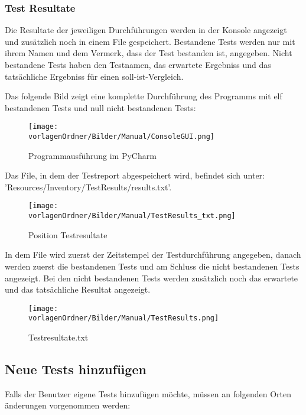 \documentclass[]{subfiles}
\begin{document}
	\subsubsection{Test Resultate}
		Die Resultate der jeweiligen Durchführungen werden in der Konsole angezeigt 
		und zusätzlich noch in einem File gespeichert.
		Bestandene Tests werden nur mit ihrem Namen und dem Vermerk, dass der Test bestanden ist,
		angegeben. 
		Nicht bestandene Tests haben den Testnamen, das erwartete Ergebniss und das tatsächliche
		Ergebniss für einen soll-ist-Vergleich.

		Das folgende Bild zeigt eine komplette Durchführung des Programms mit elf bestandenen
		Tests und null nicht bestandenen Tests: 


		\begin{figure}[h!]
			\begin{center}
				\texttt{[image: \\vorlagenOrdner/Bilder/Manual/ConsoleGUI.png]}
				\caption{Programmausführung im PyCharm}
			\end{center}
		\end{figure}

		\newpage

		Das File, in dem der Testreport abgespeichert wird, befindet sich unter: 
		'Resources/Inventory/TestResults/results.txt'.

		\begin{figure}[h!]
			\begin{center}
				\texttt{[image: \\vorlagenOrdner/Bilder/Manual/TestResults\_txt.png]}
				\caption{Position Testresultate}
			\end{center}
		\end{figure}

		In dem File wird zuerst der Zeitstempel der Testdurchführung angegeben, 
		danach werden zuerst die bestandenen Tests und am Schluss die nicht bestandenen Tests angezeigt.
		Bei den nicht bestandenen Tests werden zusätzlich noch das erwartete und das tatsächliche
		Resultat angezeigt.

		\begin{figure}[h!]
			\begin{center}
				\texttt{[image: \\vorlagenOrdner/Bilder/Manual/TestResults.png]}
				\caption{Testresultate.txt}
			\end{center}
		\end{figure}

\subsection{Neue Tests hinzufügen}
	Falls der Benutzer eigene Tests hinzufügen möchte,
	 müssen an folgenden Orten änderungen vorgenommen werden:
\end{document}
